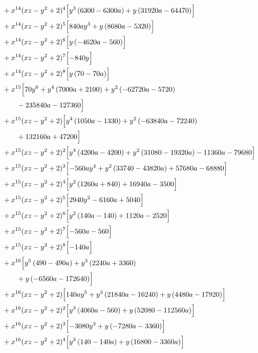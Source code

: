 \begin{align*}
&{}+x^{14}(xz-y^2+2)^{4}\Bigl[y^{3} \left(6300 - 6300 a\right) + y \left(31920 a - 64470\right)\Bigr]\\
&{}+x^{14}(xz-y^2+2)^{5}\Bigl[840 a y^{3} + y \left(8680 a - 5320\right)\Bigr]\\
&{}+x^{14}(xz-y^2+2)^{6}\Bigl[y \left(- 4620 a - 560\right)\Bigr]\\
&{}+x^{14}(xz-y^2+2)^{7}\Bigl[- 840 y\Bigr]\\
&{}+x^{14}(xz-y^2+2)^{8}\Bigl[y \left(70 - 70 a\right)\Bigr]\\
&{}+x^{15}\Bigl[70 y^{6} + y^{4} \left(7000 a + 2100\right) + y^{2} \left(- 62720 a - 5720\right)\\
&\qquad - 235840 a - 127360\Bigr]\\
&{}+x^{15}(xz-y^2+2)\Bigl[y^{4} \left(1050 a - 1330\right) + y^{2} \left(- 63840 a - 72240\right)\\
&\qquad + 132160 a + 47200\Bigr]\\
&{}+x^{15}(xz-y^2+2)^{2}\Bigl[y^{4} \left(4200 a - 4200\right) + y^{2} \left(31080 - 19320 a\right) - 11360 a - 79680\Bigr]\\
&{}+x^{15}(xz-y^2+2)^{3}\Bigl[- 560 a y^{4} + y^{2} \left(33740 - 43820 a\right) + 57680 a - 68880\Bigr]\\
&{}+x^{15}(xz-y^2+2)^{4}\Bigl[y^{2} \left(1260 a + 840\right) + 16940 a - 3500\Bigr]\\
&{}+x^{15}(xz-y^2+2)^{5}\Bigl[2940 y^{2} - 6160 a + 5040\Bigr]\\
&{}+x^{15}(xz-y^2+2)^{6}\Bigl[y^{2} \left(140 a - 140\right) + 1120 a - 2520\Bigr]\\
&{}+x^{15}(xz-y^2+2)^{7}\Bigl[- 560 a - 560\Bigr]\\
&{}+x^{15}(xz-y^2+2)^{8}\Bigl[- 140 a\Bigr]\\
&{}+x^{16}\Bigl[y^{5} \left(490 - 490 a\right) + y^{3} \left(2240 a + 3360\right)\\
&\qquad + y \left(- 6560 a - 172640\right)\Bigr]\\
&{}+x^{16}(xz-y^2+2)\Bigl[140 a y^{5} + y^{3} \left(21840 a - 16240\right) + y \left(4480 a - 17920\right)\Bigr]\\
&{}+x^{16}(xz-y^2+2)^{2}\Bigl[y^{3} \left(4060 a - 560\right) + y \left(52080 - 112560 a\right)\Bigr]\\
&{}+x^{16}(xz-y^2+2)^{3}\Bigl[- 3080 y^{3} + y \left(- 7280 a - 3360\right)\Bigr]\\
&{}+x^{16}(xz-y^2+2)^{4}\Bigl[y^{3} \left(140 - 140 a\right) + y \left(16800 - 3360 a\right)\Bigr]\\

\end{align*}
